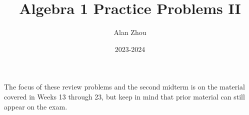 \documentclass{article}
\title{Algebra 1 Practice Problems II}
\author{Alan Zhou}
\date{2023-2024}
\begin{document}
\maketitle

The focus of these review problems and the second midterm is on the material covered in Weeks 13 through 23, but keep in mind that prior material can still appear on the exam.

\tableofcontents




% 
\end{document}
